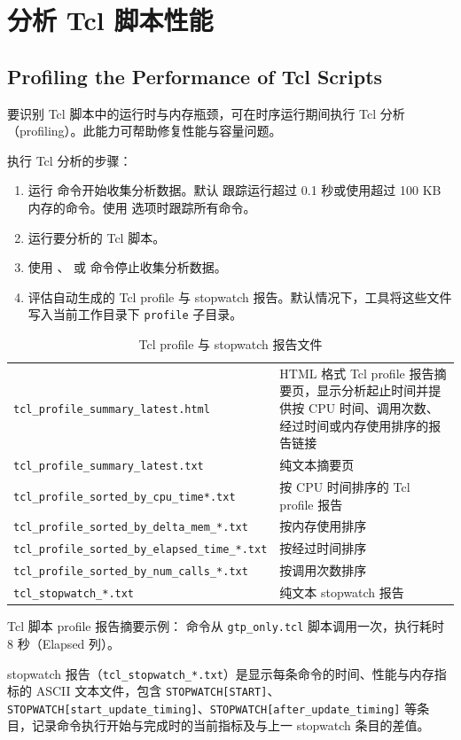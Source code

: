 \section{分析 Tcl 脚本性能}
\subsection*{Profiling the Performance of Tcl Scripts}

要识别 Tcl 脚本中的运行时与内存瓶颈，可在时序运行期间执行 Tcl 分析（profiling）。此能力可帮助修复性能与容量问题。

执行 Tcl 分析的步骤：
\begin{enumerate}
  \item 运行  命令开始收集分析数据。默认  跟踪运行超过 0.1 秒或使用超过 100 KB 内存的命令。使用  选项时跟踪所有命令。
  \item 运行要分析的 Tcl 脚本。
  \item 使用 、 或  命令停止收集分析数据。
  \item 评估自动生成的 Tcl profile 与 stopwatch 报告。默认情况下，工具将这些文件写入当前工作目录下 \texttt{profile} 子目录。
\end{enumerate}

\begin{table}[htbp]
\centering
\caption{Tcl profile 与 stopwatch 报告文件}
\small
\begin{tabular}{|L{5.5cm}|L{7.5cm}|}
\hline
{} &  \\
\hline
\texttt{tcl\_profile\_summary\_latest.html} & HTML 格式 Tcl profile 报告摘要页，显示分析起止时间并提供按 CPU 时间、调用次数、经过时间或内存使用排序的报告链接 \\
\texttt{tcl\_profile\_summary\_latest.txt} & 纯文本摘要页 \\
\texttt{tcl\_profile\_sorted\_by\_cpu\_time*.txt} & 按 CPU 时间排序的 Tcl profile 报告 \\
\texttt{tcl\_profile\_sorted\_by\_delta\_mem\_*.txt} & 按内存使用排序 \\
\texttt{tcl\_profile\_sorted\_by\_elapsed\_time\_*.txt} & 按经过时间排序 \\
\texttt{tcl\_profile\_sorted\_by\_num\_calls\_*.txt} & 按调用次数排序 \\
\texttt{tcl\_stopwatch\_*.txt} & 纯文本 stopwatch 报告 \\
\hline
\end{tabular}
\end{table}

Tcl 脚本 profile 报告摘要示例： 命令从 \texttt{gtp\_only.tcl} 脚本调用一次，执行耗时 8 秒（Elapsed 列）。


stopwatch 报告（\texttt{tcl\_stopwatch\_*.txt}）是显示每条命令的时间、性能与内存指标的 ASCII 文本文件，包含 \texttt{STOPWATCH[START]}、\texttt{STOPWATCH[start\_update\_timing]}、\texttt{STOPWATCH[after\_update\_timing]} 等条目，记录命令执行开始与完成时的当前指标及与上一 stopwatch 条目的差值。

